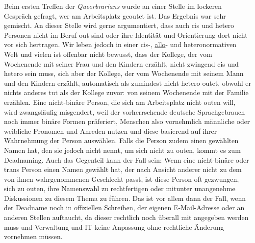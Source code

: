 \documentclass[a4paper,
fontsize=11pt,
oneside,
numbers=noperiodatend,
parskip=half-,
bibliography=totoc,
final
]{scrartcl}
\begin{document}
Beim ersten Treffen der \emph{Queerbrarians} wurde an einer Stelle im
lockeren Gespräch gefragt, wer am Arbeitsplatz geoutet ist. Das Ergebnis
war sehr gemischt. An dieser Stelle wird gerne argumentiert, dass auch
cis und hetero Personen nicht im Beruf out sind oder ihre Identität und
Orientierung dort nicht vor sich hertragen. Wir leben jedoch in einer
cis-, \href{https://queer-lexikon.net/2020/04/29/allo-allo/}{allo}- und heteronormativen Welt und vielen ist offenbar nicht bewusst,
dass der Kollege, der vom Wochenende mit seiner Frau und den Kindern
erzählt, nicht zwingend cis und hetero sein muss, sich aber der Kollege,
der vom Wochenende mit seinem Mann und den Kindern erzählt, automatisch
als zumindest nicht hetero outet, obwohl er nichts anderes tut als der
Kollege zuvor: von seinem Wochenende mit der Familie erzählen. Eine
nicht-binäre Person, die sich am Arbeitsplatz nicht outen will, wird
zwangsläufig misgendert, weil der vorherrschende deutsche Sprachgebrauch
noch immer binäre Formen präferiert, Menschen also vornehmlich männliche
oder weibliche Pronomen und Anreden nutzen und diese basierend auf ihrer
Wahrnehmung der Person auswählen. Falls die Person zudem einen gewählten
Namen hat, den sie jedoch nicht nennt, um sich nicht zu outen, kommt es
zum Deadnaming. Auch das Gegenteil kann der Fall sein: Wenn eine
nicht-binäre oder trans Person einen Namen gewählt hat, der nach Ansicht
anderer nicht zu dem von ihnen wahrgenommenen Geschlecht passt, ist
diese Person oft gezwungen, sich zu outen, ihre Namenswahl zu
rechtfertigen oder mitunter unangenehme Diskussionen zu diesem Thema zu
führen. Das ist vor allem dann der Fall, wenn der Deadname noch in
offiziellen Schreiben, der eigenen E-Mail-Adresse oder an anderen
Stellen auftaucht, da dieser rechtlich noch überall mit angegeben werden
muss und Verwaltung und IT keine Anpassung ohne rechtliche Änderung
vornehmen müssen.
\end{document}
